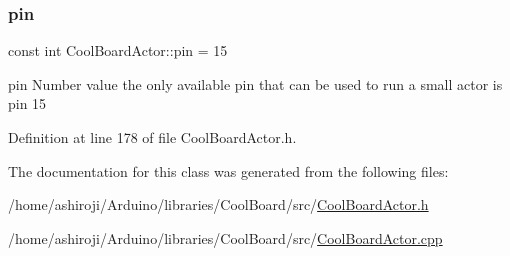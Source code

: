 \mbox{\label{class_cool_board_actor_a8b5c0b41fe6033b68d9e1ed00bc2e122}} 
\subsubsection{\texorpdfstring{pin}{pin}}
{\footnotesize\ttfamily const int Cool\+Board\+Actor\+::pin = 15\hspace{0.3cm}{\ttfamily [private]}}

pin Number value the only available pin that can be used to run a small actor is pin 15 

Definition at line 178 of file Cool\+Board\+Actor.\+h.



The documentation for this class was generated from the following files\+:\begin{DoxyCompactItemize}
\item 
/home/ashiroji/\+Arduino/libraries/\+Cool\+Board/src/\hyperlink{_cool_board_actor_8h}{Cool\+Board\+Actor.\+h}\item 
/home/ashiroji/\+Arduino/libraries/\+Cool\+Board/src/\hyperlink{_cool_board_actor_8cpp}{Cool\+Board\+Actor.\+cpp}\end{DoxyCompactItemize}
